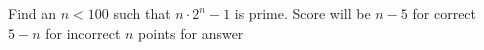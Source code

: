 Find an $n<100$ such that $n\cdot 2^n-1$ is prime. Score will be $n-5$ for correct  $5-n$ for incorrect $n$  points for answer 